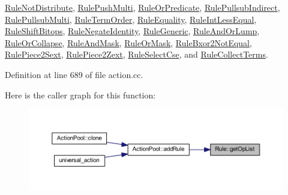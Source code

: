 \mbox{\hyperlink{class_rule_not_distribute_acca6a5aa2370ed69db49818ad3d61f1b}{Rule\+Not\+Distribute}}, \mbox{\hyperlink{class_rule_push_multi_a77532a8920828f0155494cfb01c58f09}{Rule\+Push\+Multi}}, \mbox{\hyperlink{class_rule_or_predicate_a40ca266acf32380c57cd5964d8f94adb}{Rule\+Or\+Predicate}}, \mbox{\hyperlink{class_rule_pullsub_indirect_a08b3e95c2aef200c65231e6d70b3fb4c}{Rule\+Pullsub\+Indirect}}, \mbox{\hyperlink{class_rule_pullsub_multi_a41fa2a5dcee23ca0a9a831982c9b2b0f}{Rule\+Pullsub\+Multi}}, \mbox{\hyperlink{class_rule_term_order_a2d60614aa2007130a4520cc782f8fdc7}{Rule\+Term\+Order}}, \mbox{\hyperlink{class_rule_equality_a06e285491252338eab8722052a845e8c}{Rule\+Equality}}, \mbox{\hyperlink{class_rule_int_less_equal_a1926c44b4c14298c375989f03264a4ee}{Rule\+Int\+Less\+Equal}}, \mbox{\hyperlink{class_rule_shift_bitops_ab97d4dba3828ab45c0d979c971b47b12}{Rule\+Shift\+Bitops}}, \mbox{\hyperlink{class_rule_negate_identity_a7e6f7cc4b064dbb504527dcebe07e290}{Rule\+Negate\+Identity}}, \mbox{\hyperlink{class_rule_generic_a76ff5779a40a75ebdd0d2b213a35f1ec}{Rule\+Generic}}, \mbox{\hyperlink{class_rule_and_or_lump_aa40ff67a44e672e88dbb6485309a482f}{Rule\+And\+Or\+Lump}}, \mbox{\hyperlink{class_rule_or_collapse_acfa78034c049837894b08b7ce71c2249}{Rule\+Or\+Collapse}}, \mbox{\hyperlink{class_rule_and_mask_a787f3bb11488a68584a55ef1fe378be7}{Rule\+And\+Mask}}, \mbox{\hyperlink{class_rule_or_mask_a6261fe302ae9f251cfe27056e702fe49}{Rule\+Or\+Mask}}, \mbox{\hyperlink{class_rule_bxor2_not_equal_a9bb1bfa0c646bd223ed71f590d803046}{Rule\+Bxor2\+Not\+Equal}}, \mbox{\hyperlink{class_rule_piece2_sext_aadf1e83d42fa92a680d1b3b1ee68fa1e}{Rule\+Piece2\+Sext}}, \mbox{\hyperlink{class_rule_piece2_zext_a10fb5ff85b1f1397eb17dc6c6fc47133}{Rule\+Piece2\+Zext}}, \mbox{\hyperlink{class_rule_select_cse_ac80eb4274ae96abff206fa852d61d0cc}{Rule\+Select\+Cse}}, and \mbox{\hyperlink{class_rule_collect_terms_a86d2d1fdf9cbaa1d7403a786a300e477}{Rule\+Collect\+Terms}}.



Definition at line 689 of file action.\+cc.

Here is the caller graph for this function\+:
\nopagebreak
\begin{figure}[H]
\begin{center}
\leavevmode
\includegraphics[width=350pt]{class_rule_a4023bfc7825de0ab866790551856d10e_icgraph}
\end{center}
\end{figure}
\mbox{\label{class_rule_a8e55ac34d63aaff7668c1f60cb2d1756}} 
